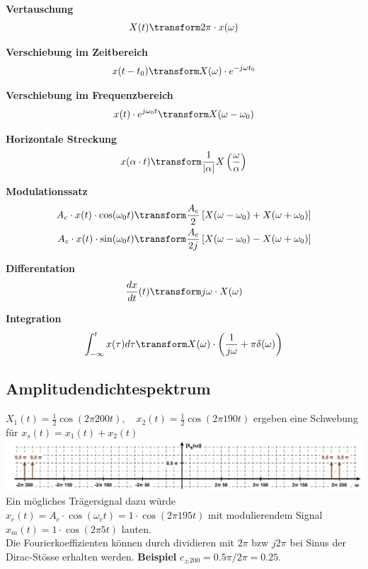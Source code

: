 \noindent\textbf{Vertauschung}
\begin{align*}
	X(t) \transform 2\pi \cdot x(\-\omega)
\end{align*}

\noindent\textbf{Verschiebung im Zeitbereich}
\begin{align*}
	x(t - t_0) \transform X(\omega) \cdot e^{-j\omega t_0} 
\end{align*}

\noindent\textbf{Verschiebung im Frequenzbereich}
\begin{align*}
	x(t) \cdot e^{j\omega_0 t} \transform X(\omega - \omega_0)
\end{align*}

\noindent\textbf{Horizontale Streckung}
\begin{align*}
	x(\alpha \cdot t) \transform \frac{1}{|\alpha|}X\left(\frac{\omega}{\alpha}\right)
\end{align*}

\noindent\textbf{Modulationssatz}
\begin{align*}
	A_c \cdot x(t) \cdot \cos(\omega_0t) &\transform \frac{A_c}{2}\left[X(\omega - \omega_0) + X(\omega + \omega_0)\right] \\
	A_c \cdot x(t) \cdot \sin(\omega_0t) &\transform \frac{A_c}{2j}\left[X(\omega - \omega_0) - X(\omega + \omega_0)\right]
\end{align*}

\noindent\textbf{Differentation}
\begin{align*}
	\frac{dx}{dt}(t) \transform j\omega \cdot X(\omega)
\end{align*}

\noindent\textbf{Integration}
\begin{align*}
	\int_{-\infty}^{t}x(\tau)d\tau \transform X(\omega)\cdot \left(\frac{1}{j\omega} + \pi \delta(\omega)\right)
\end{align*}

\subsection{Amplitudendichtespektrum}
$X_1(t) = \frac{1}{2}\cos(2\pi200t),\quad x_2(t) = \frac{1}{2}\cos(2\pi190t)$ ergeben eine Schwebung für $x_s(t) = x_1(t) + x_2(t)$\\
\includegraphics[width=\columnwidth]{Images/amplitudendichtespektrum}
Ein mögliches Trägersignal dazu würde $x_c(t) = A_c\cdot\cos(\omega_ct) = 1\cdot\cos(2\pi195t)$ mit modulierendem Signal $x_m(t) = 1\cdot\cos(2\pi5t)$ lauten.\\

Die Fourierkoeffizienten können durch dividieren mit $2\pi$ bzw $j2\pi$ bei Sinus der Dirac-Stösse erhalten werden. \textbf{Beispiel} $c_{\pm200} = 0.5\pi / 2\pi = 0.25$.